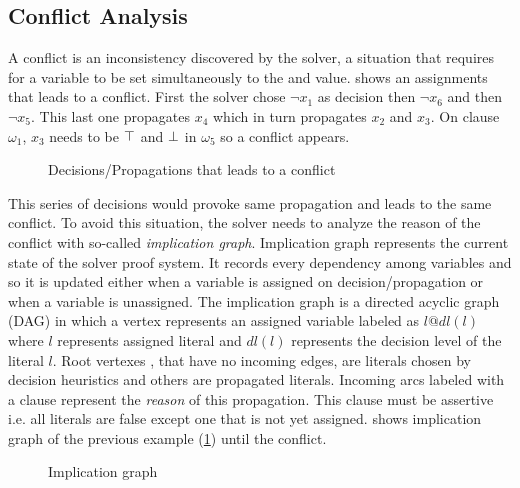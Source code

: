 \subsection{Conflict Analysis}
A conflict is an inconsistency discovered by the solver, a situation that requires for a variable to be set 
simultaneously to the \true and \false value.  shows an assignments that leads to a conflict.
First the solver chose $\neg x_1$ as decision then $\neg x_6$ and then $\neg x_5$. This last one propagates $x_4$
which in turn propagates $x_2$ and $x_3$. On clause $\omega_1$, $x_3$ needs to be $\top$ and $\bot$ in $\omega_5$ so
a conflict appears.
\begin{figure}[!htbp]
 \centering
  
 \caption{Decisions/Propagations that leads to a  conflict}
 \label{fig:conflict}
\end{figure}
This series of decisions would provoke same propagation and leads to the same conflict. To avoid this
situation, the solver needs to analyze the reason of the conflict with so-called \emph{implication graph}.
Implication graph represents the current state of the solver proof system. It records every dependency
among variables and so it is updated either when a variable is assigned on decision/propagation or  when a variable
is unassigned. The implication graph is a directed acyclic graph (DAG) in which a vertex represents an assigned variable labeled as $l@dl(l)$ where $l$ represents assigned literal and $dl(l)$ represents the decision level of the literal $l$.
Root vertexes , that have no incoming edges, are literals chosen by decision heuristics and others are 
propagated literals.
Incoming arcs labeled with a clause represent the \emph{reason} of this propagation.
This clause must be assertive i.e. all  literals are false except one that is not yet assigned.
 shows implication graph of the previous example (\cref{fig:conflict}) until the conflict.
\begin{figure}[!htbp]
 \centering
 
 \caption{Implication graph}
 \label{fig:implication-graph}
\end{figure}

